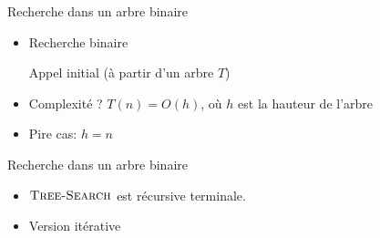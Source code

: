 \begin{frame}{Recherche dans un arbre binaire}
\begin{itemize}
\item Recherche binaire
\begin{center}
\begin{small}

\medskip

Appel initial (à partir d'un arbre $T$)\\
\end{small}
\end{center}

\bigskip

\item Complexité ? $T(n)=O(h)$, où $h$ est la hauteur de l'arbre
\item Pire cas: $h=n$
\end{itemize}

\end{frame}

\begin{frame}{Recherche dans un arbre binaire}
\begin{itemize}
\item $\textnormal{\scshape Tree-Search}$ est récursive terminale.
\item Version itérative
\begin{center}
\begin{small}
\end{small}
\end{center}

\bigskip

\end{itemize}

\end{frame}

